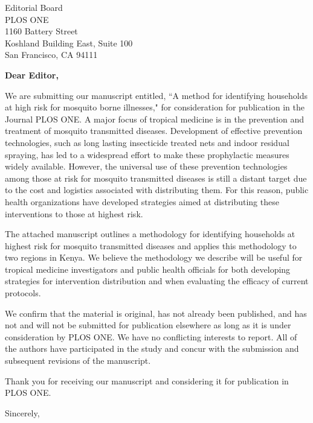 \documentclass{letter}\usepackage[]{graphicx}\usepackage[]{color}
\begin{document}

\begin{letter}{Editorial Board \\ PLOS ONE \\ 1160 Battery Street \\ Koshland Building East, Suite 100 \\ San Francisco, CA 94111} %


\opening{\textbf{Dear Editor,}}
 
We are submitting our manuscript entitled, ``A method for identifying households at high risk for mosquito borne illnesses," for consideration for publication in the Journal PLOS ONE.  A major focus of tropical medicine is in the prevention and treatment of mosquito transmitted diseases.  Development of effective prevention technologies, such as long lasting insecticide treated nets and indoor residual spraying, has led to a widespread effort to make these prophylactic measures widely available.  However, the universal use of these prevention technologies among those at risk for mosquito transmitted diseases is still a distant target due to the cost and logistics associated with distributing them.  For this reason, public health organizations have developed strategies aimed at distributing these interventions to those at highest risk.


The attached manuscript outlines a methodology for identifying households at highest risk for mosquito transmitted diseases and applies this methodology to two regions in Kenya.  We believe the methodology we describe will be useful for tropical medicine investigators and public health officials for both developing strategies for intervention distribution and when evaluating the efficacy of current protocols.


We confirm that the material is original, has not already been published, and has not and will not be submitted for publication elsewhere as long as it is under consideration by PLOS ONE.  We have no conflicting interests to report.  All of the authors have participated in the study and concur with the submission and subsequent revisions of the manuscript.

Thank you for receiving our manuscript and considering it for publication in PLOS ONE. 

\vspace{2\parskip} %
\closing{Sincerely,}
\vspace{2\parskip} %




\end{letter}
 
\end{document}
